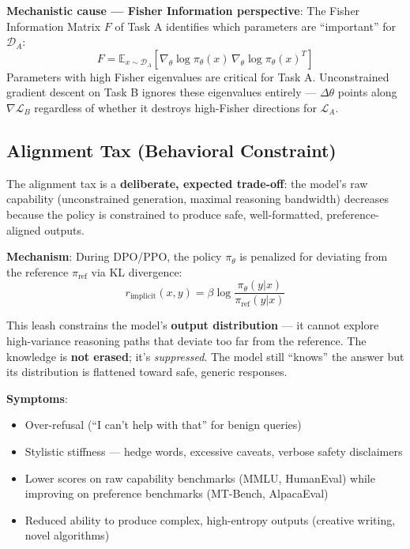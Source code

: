 \textbf{Mechanistic cause --- Fisher Information perspective}: The Fisher Information Matrix $F$ of Task A identifies which parameters are ``important'' for $\mathcal{D}_A$: 
\begin{equation}
F = \mathbb{E}_{x \sim \mathcal{D}_A}\!\left[\nabla_\theta \log \pi_\theta(x)\, \nabla_\theta \log \pi_\theta(x)^T\right]
\end{equation}
 Parameters with high Fisher eigenvalues are critical for Task A. Unconstrained gradient descent on Task B ignores these eigenvalues entirely --- $\Delta\theta$ points along $\nabla\mathcal{L}_B$ regardless of whether it destroys high-Fisher directions for $\mathcal{L}_A$.

\subsection{Alignment Tax (Behavioral Constraint)}
\label{alignment-tax-behavioral-constraint}

The alignment tax is a \textbf{deliberate, expected trade-off}: the model’s raw capability (unconstrained generation, maximal reasoning bandwidth) decreases because the policy is constrained to produce safe, well-formatted, preference-aligned outputs.

\textbf{Mechanism}: During DPO/PPO, the policy $\pi_\theta$ is penalized for deviating from the reference $\pi_{\text{ref}}$ via KL divergence: 
\begin{equation}
r_{\text{implicit}}(x, y) = \beta \log \frac{\pi_\theta(y|x)}{\pi_{\text{ref}}(y|x)}
\end{equation}

This leash constrains the model’s \textbf{output distribution} --- it cannot explore high-variance reasoning paths that deviate too far from the reference. The knowledge is \textbf{not erased}; it’s \emph{suppressed}. The model still ``knows'' the answer but its distribution is flattened toward safe, generic responses.

\textbf{Symptoms}:

\begin{itemize}
  \item Over-refusal (``I can’t help with that'' for benign queries)
  \item Stylistic stiffness --- hedge words, excessive caveats, verbose safety disclaimers
  \item Lower scores on raw capability benchmarks (MMLU, HumanEval) while improving on preference benchmarks (MT-Bench, AlpacaEval)
  \item Reduced ability to produce complex, high-entropy outputs (creative writing, novel algorithms)
\end{itemize}

